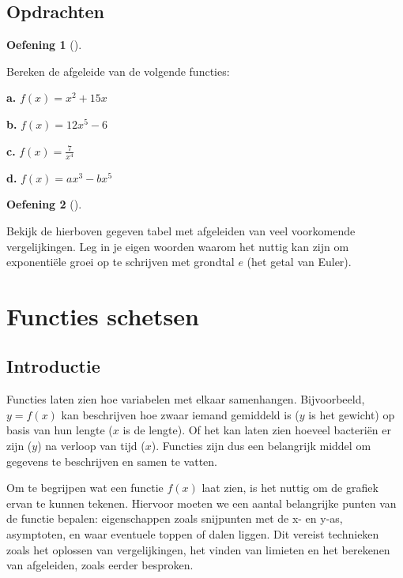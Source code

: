 \documentclass[
  a4paper,
]{scrbook}
\theoremstyle{definition}
\newtheorem{exercise}{Oefening}[chapter]
\theoremstyle{remark}
\begin{document}
\hypertarget{opdrachten-4}{%
\section{Opdrachten}\label{opdrachten-4}}

\begin{exercise}[]\protect\hypertarget{exr-afg-1}{}\label{exr-afg-1}

Bereken de afgeleide van de volgende functies:

\textbf{a.} \(f(x)=x^2+15x\)

\textbf{b.} \(f(x)=12x^5-6\)

\textbf{c.} \(f(x)=\frac{7}{x^4}\)

\textbf{d.} \(f(x)=ax^3-bx^5\)

\end{exercise}

\begin{exercise}[]\protect\hypertarget{exr-afg-2}{}\label{exr-afg-2}

Bekijk de hierboven gegeven tabel met afgeleiden van veel voorkomende
vergelijkingen. Leg in je eigen woorden waarom het nuttig kan zijn om
exponentiële groei op te schrijven met grondtal \(e\) (het getal van
Euler).

\end{exercise}

\hypertarget{sec-schetsen}{%
\chapter{Functies schetsen}\label{sec-schetsen}}

\hypertarget{introductie-5}{%
\section{Introductie}\label{introductie-5}}

Functies laten zien hoe variabelen met elkaar samenhangen. Bijvoorbeeld,
\(y=f(x)\) kan beschrijven hoe zwaar iemand gemiddeld is (\(y\) is het
gewicht) op basis van hun lengte (\(x\) is de lengte). Of het kan laten
zien hoeveel bacteriën er zijn (\(y\)) na verloop van tijd (\(x\)).
Functies zijn dus een belangrijk middel om gegevens te beschrijven en
samen te vatten.

Om te begrijpen wat een functie \(f(x)\) laat zien, is het nuttig om de
grafiek ervan te kunnen tekenen. Hiervoor moeten we een aantal
belangrijke punten van de functie bepalen: eigenschappen zoals
snijpunten met de x- en y-as, asymptoten, en waar eventuele toppen of
dalen liggen. Dit vereist technieken zoals het oplossen van
vergelijkingen, het vinden van limieten en het berekenen van afgeleiden,
zoals eerder besproken.
\end{document}
